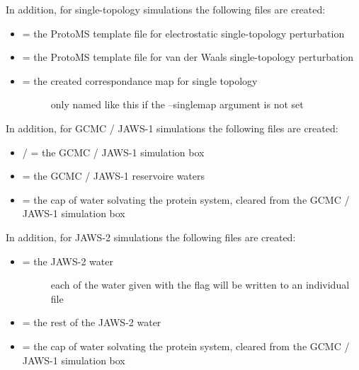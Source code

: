 \documentclass[letterpaper,10pt,english]{sphinxmanual}
\begin{document}
In addition, for single-topology simulations the following files are created:
\begin{itemize}
\item {} 
 = the ProtoMS template file for electrostatic single-topology perturbation

\item {} 
 = the ProtoMS template file for van der Waals single-topology perturbation

\item {} \begin{description}
\item[{ = the created correspondance map for single topology}] \leavevmode
only named like this if the --singlemap argument is not set

\end{description}

\end{itemize}

In addition, for GCMC / JAWS-1 simulations the following files are created:
\begin{itemize}
\item {} 
 /  = the GCMC / JAWS-1 simulation box

\item {} 
 = the GCMC / JAWS-1 reservoire waters

\item {} 
 = the cap of water solvating the protein system, cleared from the GCMC / JAWS-1 simulation box

\end{itemize}

In addition, for JAWS-2 simulations the following files are created:
\begin{itemize}
\item {} \begin{description}
\item[{ = the JAWS-2 water}] \leavevmode
each of the water given with the  flag will be written to an individual file

\end{description}

\item {} 
 = the rest of the JAWS-2 water

\item {} 
 = the cap of water solvating the protein system, cleared from the GCMC / JAWS-1 simulation box

\end{itemize}
\end{document}
